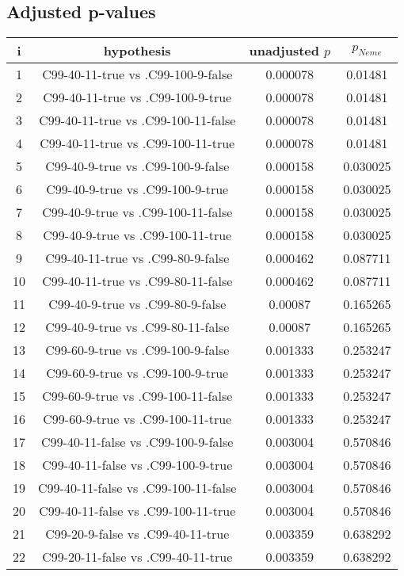 \documentclass[a4paper,10pt]{article}
\begin{document}
\begin{landscape}
\pagebreak

\subsection{Adjusted p-values}

\begin{table}[!htp]
\centering\scriptsize
\begin{tabular}{cccc}
i&hypothesis&unadjusted $p$&$p_{Neme}$\\
\hline1&C99-40-11-true vs .C99-100-9-false&0.000078&0.01481\\
2&C99-40-11-true vs .C99-100-9-true&0.000078&0.01481\\
3&C99-40-11-true vs .C99-100-11-false&0.000078&0.01481\\
4&C99-40-11-true vs .C99-100-11-true&0.000078&0.01481\\
5&C99-40-9-true vs .C99-100-9-false&0.000158&0.030025\\
6&C99-40-9-true vs .C99-100-9-true&0.000158&0.030025\\
7&C99-40-9-true vs .C99-100-11-false&0.000158&0.030025\\
8&C99-40-9-true vs .C99-100-11-true&0.000158&0.030025\\
9&C99-40-11-true vs .C99-80-9-false&0.000462&0.087711\\
10&C99-40-11-true vs .C99-80-11-false&0.000462&0.087711\\
11&C99-40-9-true vs .C99-80-9-false&0.00087&0.165265\\
12&C99-40-9-true vs .C99-80-11-false&0.00087&0.165265\\
13&C99-60-9-true vs .C99-100-9-false&0.001333&0.253247\\
14&C99-60-9-true vs .C99-100-9-true&0.001333&0.253247\\
15&C99-60-9-true vs .C99-100-11-false&0.001333&0.253247\\
16&C99-60-9-true vs .C99-100-11-true&0.001333&0.253247\\
17&C99-40-11-false vs .C99-100-9-false&0.003004&0.570846\\
18&C99-40-11-false vs .C99-100-9-true&0.003004&0.570846\\
19&C99-40-11-false vs .C99-100-11-false&0.003004&0.570846\\
20&C99-40-11-false vs .C99-100-11-true&0.003004&0.570846\\
21&C99-20-9-false vs .C99-40-11-true&0.003359&0.638292\\
22&C99-20-11-false vs .C99-40-11-true&0.003359&0.638292\\

\end{tabular}
\end{table}
\end{landscape}
\end{document}
